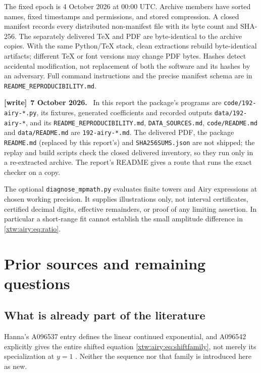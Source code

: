\documentclass[11pt]{article}
\theoremstyle{remark}\newtheorem{remark}[theorem]{Remark}
\newcommand{\file}[1]{\nolinkurl{#1}}
\newenvironment{writenote}[1][]{\par\smallskip\begingroup\small
 \noindent\textbf{[write]}\if\relax\detokenize{#1}\relax\else~\textbf{#1.}\fi\ }%
 {\par\endgroup\smallskip}
\begin{document}
The fixed epoch is 4 October 2026 at 00:00 UTC. Archive members have sorted
names, fixed timestamps and permissions, and stored compression. A closed
manifest records every distributed non-manifest file with its byte count
and SHA-256. The separately delivered TeX and PDF are byte-identical to the
archive copies. With the same Python/TeX stack, clean extractions rebuild
byte-identical artifacts; different TeX or font versions may change PDF
bytes. Hashes detect accidental modification, not replacement of both the
software and its hashes by an adversary. Full command instructions and the
precise manifest schema are in \texttt{README\_REPRODUCIBILITY.md}.
\begin{writenote}[7 October 2026]
In this report the package's programs are \file{code/192-airy-*.py}, its fixtures, generated coefficients and recorded outputs \file{data/192-airy-*}, and its \file{README_REPRODUCIBILITY.md}, \file{DATA_SOURCES.md}, \file{code/README.md} and \file{data/README.md} are \file{192-airy-*.md}. The delivered PDF, the package \file{README.md} (replaced by this report's) and \file{SHA256SUMS.json} are not shipped; the replay and build scripts check the closed delivered inventory, so they run only in a re-extracted archive. The report's README gives a route that runs the exact checker on a copy.
\end{writenote}

The optional \texttt{diagnose\_mpmath.py} evaluates finite towers and Airy
expressions at chosen working precision. It supplies illustrations only,
not interval certificates, certified decimal digits, effective remainders,
or proof of any limiting assertion. In particular a short-range fit cannot
establish the small amplitude difference in \eqref{xtw:airy:eq:ratio}.

\section{Prior sources and remaining questions}\label{xtw:airy:sec:literature}
\subsection{What is already part of the literature}
Hanna's A096537 entry defines the linear continued exponential, and A096542
explicitly gives the entire shifted equation \eqref{xtw:airy:eq:shiftfamily}, not
merely its specialization at $y=1$ \cite{oeis537,oeis542}. Neither the sequence
nor that family is introduced here as new.
\end{document}
